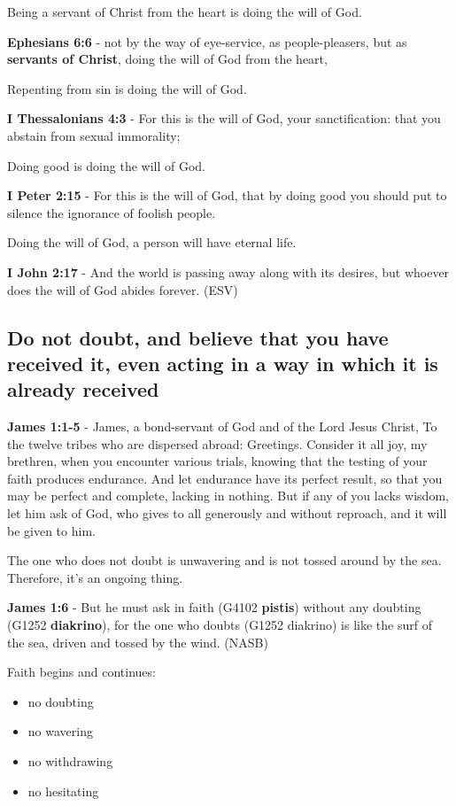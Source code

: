 \documentclass[11pt]{article}
\begin{document}
Being a servant of Christ from the heart is doing the will of God.

\textbf{Ephesians 6:6} - not by the way of eye-service, as people-pleasers, but as \textbf{servants of Christ}, doing the will of God from the heart,

Repenting from sin is doing the will of God.

\textbf{I Thessalonians 4:3} - For this is the will of God, your sanctification: that you abstain from sexual immorality;

Doing good is doing the will of God.

\textbf{I Peter 2:15} - For this is the will of God, that by doing good you should put to silence the ignorance of foolish people.

Doing the will of God, a person will have eternal life.

\textbf{I John 2:17} - And the world is passing away along with its desires, but whoever does the will of God abides forever. (ESV)

\subsection{Do not doubt, and believe that you have received it, even acting in a way in which it is already received}
\label{sec:org0f9ca44}
\textbf{James 1:1-5} - James, a bond-servant of God and of the Lord Jesus Christ, To the twelve tribes who are dispersed abroad: Greetings.  Consider it all joy, my brethren, when you encounter various trials, knowing that the testing of your faith produces endurance.  And let endurance have its perfect result, so that you may be perfect and complete, lacking in nothing.  But if any of you lacks wisdom, let him ask of God, who gives to all generously and without reproach, and it will be given to him.

The one who does not doubt is unwavering and is not tossed around by the sea.
Therefore, it's an ongoing thing.

\textbf{James 1:6} - But he must ask in faith (G4102 \textbf{pistis}) without any doubting (G1252 \textbf{diakrino}), for the one who doubts (G1252 diakrino) is like the surf of the sea, driven and tossed by the wind. (NASB)

Faith begins and continues:
\begin{itemize}
\item no doubting
\item no wavering
\item no withdrawing
\item no hesitating
\end{itemize}
\end{document}
